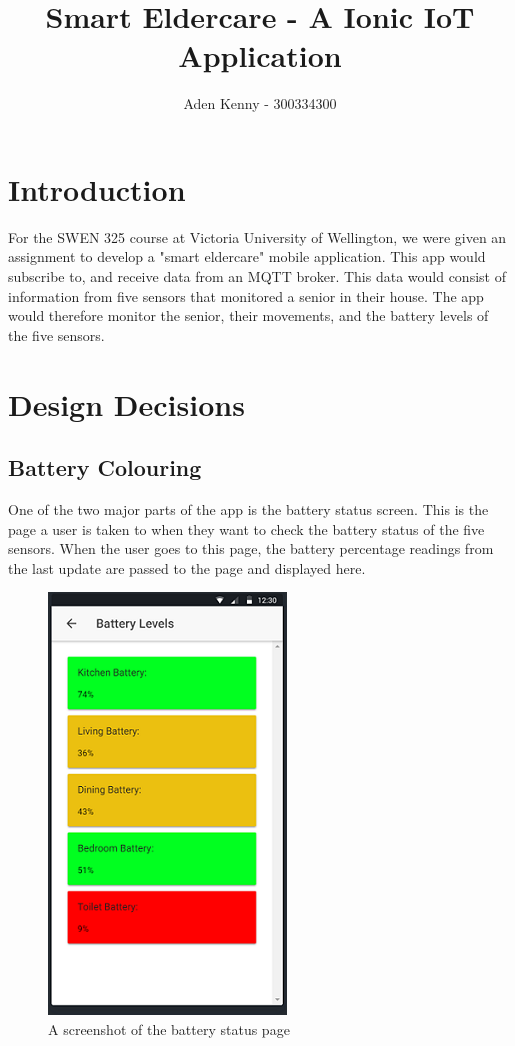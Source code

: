 \documentclass[a4paper, 11pt]{article}
\begin{document}
\title{Smart Eldercare - A Ionic IoT Application}

\author{
Aden Kenny - 300334300
}

\maketitle

\section{Introduction}

For the SWEN 325 course at Victoria University of Wellington, we were given an assignment to develop a "smart eldercare" mobile application. This app would subscribe to, and receive data from an MQTT broker. This data would consist of information from five sensors that monitored a senior in their house. The app would therefore monitor the senior, their movements, and the battery levels of the five sensors.

\section{Design Decisions}
\subsection{Battery Colouring}

One of the two major parts of the app is the battery status screen. This is the page a user is taken to when they want to check the battery status of the five sensors. When the user goes to this page, the battery percentage readings from the last update are passed to the page and displayed here.

\begin{figure}
\includegraphics{battery}
\caption{A screenshot of the battery status page \label{bat}}
\end{figure}
\end{document}
